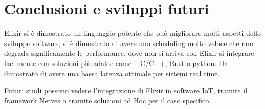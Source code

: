 \chapter*{Conclusioni e sviluppi futuri}

Elixir si è dimostrato un linguaggio potente che
può migliorare molti aspetti dello sviluppo software,
si è dimostrato di avere uno scheduling molto
veloce che non degrada significamente le performance,
dove non si arriva con Elixir si integrare facilmente
con soluzioni più adatte come il C/C++, Rust o python.
Ha dimostrato di avere una bassa latenza ottimale per
sistemi real time.

Futuri studi possono vedere l'integrazione di Elixir
in software IoT, tramite il framework Nerves o tramite
soluzioni ad Hoc per il caso specifico.